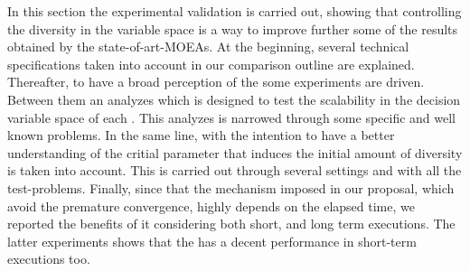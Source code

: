 In this section the experimental validation is carried out, showing that controlling the diversity in the variable space is a way to improve further some of the results obtained by the state-of-art-MOEAs.
%
At the beginning, several technical specifications taken into account in our comparison outline are explained.
%
Thereafter, to have a broad perception of the \VSDMOEA{} some experiments are driven.
%
Between them an analyzes which is designed to test the scalability in the decision variable space of each \MOEA{}.
%
This analyzes is narrowed through some specific and well known problems.
%
In the same line, with the intention to have a better understanding of the critial parameter that induces the initial amount of diversity is taken into account.
%
This is carried out through several settings and with all the test-problems.
%
Finally, since that the mechanism imposed in our proposal, which avoid the premature convergence, highly depends on the elapsed time, we reported the benefits of it considering both short, and long term executions.
%
The latter experiments shows that the \VSDMOEA{} has a decent performance in short-term executions too.
%

